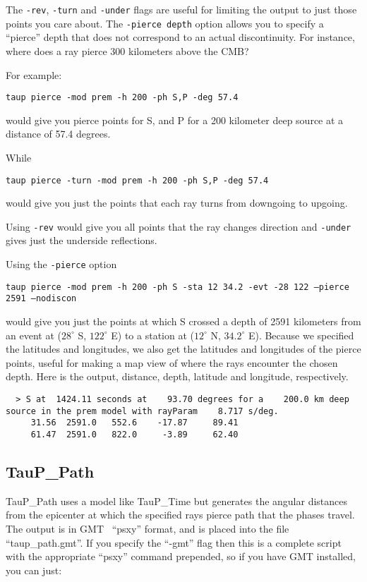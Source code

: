 The \texttt{-rev}, \texttt{-turn} and \texttt{-under} flags are useful
for limiting the output
to just those points you care about. The \texttt{-pierce depth} option
allows you
to specify a ``pierce'' depth that does not correspond to an
actual discontinuity. For instance, where does a ray pierce 300 kilometers
above the CMB?

For example:

\texttt{taup pierce -mod prem -h 200 -ph S,P -deg 57.4}

would give you pierce points for S, and P for a 200 kilometer
deep source at a distance of 57.4 degrees.

While

\texttt{taup pierce -turn -mod prem -h 200 -ph S,P -deg 57.4}

would give you just the points that each ray turns from downgoing to upgoing.

Using \texttt{-rev} would give you all points that the ray changes direction and \texttt{-under} gives just the underside reflections.

Using the \texttt{-pierce} option

\texttt{taup pierce -mod prem -h 200 -ph S -sta 12 34.2 -evt -28 122 --pierce 2591 --nodiscon}

would give you just the points at which S crossed a depth of 2591 kilometers
from an event at ($28^\circ$ S, $122^\circ$ E)
to a station at ($12^\circ$ N, $34.2^\circ$ E).
Because we specified the latitudes and longitudes, we also get the
latitudes and longitudes of
the pierce points, useful for making
a map view of where the rays encounter the chosen depth. Here is the output,
distance, depth, latitude and longitude, respectively.
\begin{verbatim}
  > S at  1424.11 seconds at    93.70 degrees for a    200.0 km deep source in the prem model with rayParam    8.717 s/deg.
     31.56  2591.0   552.6    -17.87     89.41
     61.47  2591.0   822.0     -3.89     62.40
\end{verbatim}

\subsection{TauP\_Path}
TauP\_Path uses a model like TauP\_Time but
generates  the
angular distances from the epicenter at which the specified rays pierce
path that the phases travel. The output is in GMT~\cite{GMT} ``psxy'' format, and is
placed into the file ``taup\_path.gmt''.
If you specify the ``-gmt'' flag then this
is a complete script with the appropriate ``psxy'' command prepended, so if you
have GMT installed, you can just:

